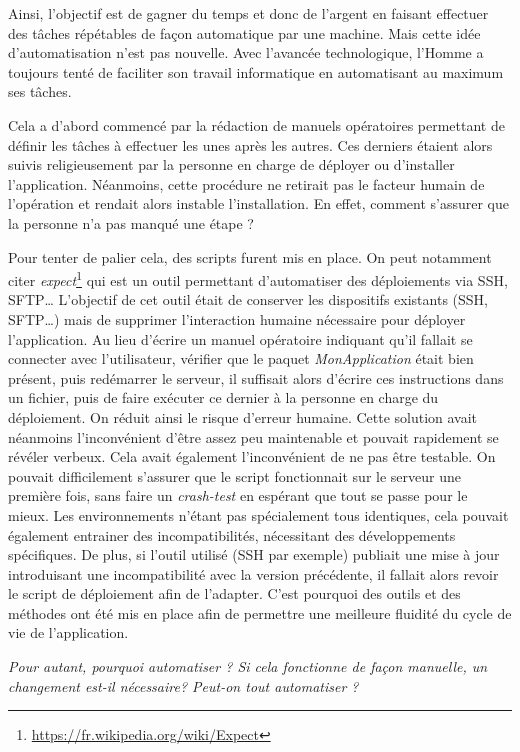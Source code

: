 \clearpage

Ainsi, l'objectif est de gagner du temps et donc de l'argent en faisant effectuer des tâches répétables de façon automatique par une machine. Mais cette idée d'automatisation n'est pas nouvelle. Avec l'avancée technologique, l'Homme a toujours tenté de faciliter son travail informatique en automatisant au maximum ses tâches. 

Cela a d'abord commencé par la rédaction de manuels opératoires permettant de définir les tâches à effectuer les unes après les autres. Ces derniers étaient alors suivis religieusement par la personne en charge de déployer ou d'installer l'application. Néanmoins, cette procédure ne retirait pas le facteur humain de l'opération et rendait alors instable l'installation. En effet, comment s'assurer que la personne n'a pas manqué une étape ? 

Pour tenter de palier cela, des scripts furent mis en place. On peut notamment citer \emph{expect}\footnote{\url{https://fr.wikipedia.org/wiki/Expect}} qui est un outil permettant d'automatiser des déploiements via \gls{SSH}, \gls{SFTP}\ldots{} L'objectif de cet outil était de conserver les dispositifs existants (\gls{SSH}, \gls{SFTP}\ldots) mais de supprimer l'interaction humaine nécessaire pour déployer l'application. Au lieu d'écrire un manuel opératoire indiquant qu'il fallait se connecter avec l'utilisateur, vérifier que le paquet \emph{MonApplication} était bien présent, puis redémarrer le serveur, il suffisait alors d'écrire ces instructions dans un fichier, puis de faire exécuter ce dernier à la personne en charge du déploiement. On réduit ainsi le risque d'erreur humaine. Cette solution avait néanmoins l'inconvénient d'être assez peu maintenable et pouvait rapidement se révéler verbeux. Cela avait également l'inconvénient de ne pas être testable. On pouvait difficilement s'assurer que le script fonctionnait sur le serveur une première fois, sans faire un \emph{crash-test} en espérant que tout se passe pour le mieux. Les environnements n'étant pas spécialement tous identiques, cela pouvait également entrainer des incompatibilités, nécessitant des développements spécifiques. De plus, si l'outil utilisé (\gls{SSH} par exemple) publiait une mise à jour introduisant une incompatibilité avec la version précédente, il fallait alors revoir le script de déploiement afin de l'adapter. C'est pourquoi des outils et des méthodes ont été mis en place afin de permettre une meilleure fluidité du cycle de vie de l'application. 

\emph{Pour autant, pourquoi automatiser ? Si cela fonctionne de façon manuelle, un changement est-il nécessaire? Peut-on tout automatiser ?}

